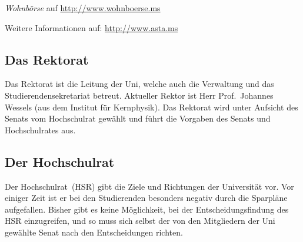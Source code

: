 \begin{multicols*}{2}
\begin{center}
{\begin{minipage}{0.95\columnwidth}
		\textit{Wohnbörse} auf \url{http://www.wohnboerse.ms}
		
		\medskip
		
		Weitere Informationen auf: \url{http://www.asta.ms}
	\end{minipage}
	}
\end{center}

\subsection{Das Rektorat}
Das Rektorat ist die Leitung der Uni, welche auch die Verwaltung und das Studierendensekretariat betreut.
Aktueller Rektor ist Herr Prof.\ Johannes Wessels (aus dem Institut für Kernphysik).
Das Rektorat wird unter Aufsicht des Senats vom Hochschulrat gewählt und führt die Vorgaben des Senats und Hochschulrates aus.

\subsection{Der Hochschulrat}
Der Hochschulrat~(HSR) gibt die Ziele und Richtungen der Universität vor.
Vor einiger Zeit ist er bei den Studierenden besonders negativ durch die Sparpläne aufgefallen.
Bisher gibt es keine Möglichkeit, bei der Entscheidungsfindung des HSR einzugreifen, und so muss sich selbst der von den Mitgliedern der Uni gewählte Senat nach den Entscheidungen richten.

\end{multicols*}

